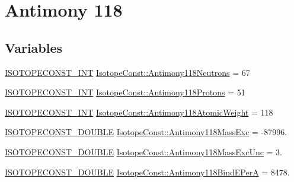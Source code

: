 \hypertarget{group___isotope_const-_antimony-_sb118}{}\section{Antimony 118}
\label{group___isotope_const-_antimony-_sb118}
\subsection*{Variables}
\begin{DoxyCompactItemize}
\item 
\mbox{\hyperlink{group___isotope_const-_macros_ga5f18360b3e99483a35c32d789e62621c}{I\+S\+O\+T\+O\+P\+E\+C\+O\+N\+S\+T\+\_\+\+I\+NT}} \mbox{\hyperlink{group___isotope_const-_antimony-_sb118_ga57824cd81ce18bb7cb056f678b6c39a5}{Isotope\+Const\+::\+Antimony118\+Neutrons}} = 67
\item 
\mbox{\hyperlink{group___isotope_const-_macros_ga5f18360b3e99483a35c32d789e62621c}{I\+S\+O\+T\+O\+P\+E\+C\+O\+N\+S\+T\+\_\+\+I\+NT}} \mbox{\hyperlink{group___isotope_const-_antimony-_sb118_gac2e57822b7e37ffd384552a788d5b4aa}{Isotope\+Const\+::\+Antimony118\+Protons}} = 51
\item 
\mbox{\hyperlink{group___isotope_const-_macros_ga5f18360b3e99483a35c32d789e62621c}{I\+S\+O\+T\+O\+P\+E\+C\+O\+N\+S\+T\+\_\+\+I\+NT}} \mbox{\hyperlink{group___isotope_const-_antimony-_sb118_gab48930b4ec0af85ef4e947e227e0b497}{Isotope\+Const\+::\+Antimony118\+Atomic\+Weight}} = 118
\item 
\mbox{\hyperlink{group___isotope_const-_macros_ga8f45a7272ce02c0b4c65c44636ed719a}{I\+S\+O\+T\+O\+P\+E\+C\+O\+N\+S\+T\+\_\+\+D\+O\+U\+B\+LE}} \mbox{\hyperlink{group___isotope_const-_antimony-_sb118_gad832e4fb2180740f5e4dee671639a58f}{Isotope\+Const\+::\+Antimony118\+Mass\+Exc}} = -\/87996.
\item 
\mbox{\hyperlink{group___isotope_const-_macros_ga8f45a7272ce02c0b4c65c44636ed719a}{I\+S\+O\+T\+O\+P\+E\+C\+O\+N\+S\+T\+\_\+\+D\+O\+U\+B\+LE}} \mbox{\hyperlink{group___isotope_const-_antimony-_sb118_ga601e3974eaffab713f4c8ef38307bdd0}{Isotope\+Const\+::\+Antimony118\+Mass\+Exc\+Unc}} = 3.
\item 
\mbox{\hyperlink{group___isotope_const-_macros_ga8f45a7272ce02c0b4c65c44636ed719a}{I\+S\+O\+T\+O\+P\+E\+C\+O\+N\+S\+T\+\_\+\+D\+O\+U\+B\+LE}} \mbox{\hyperlink{group___isotope_const-_antimony-_sb118_ga0eb4e4bd34c29a9b681bc7b14e00e416}{Isotope\+Const\+::\+Antimony118\+Bind\+E\+PerA}} = 8478.
\item 

\end{DoxyCompactItemize}
